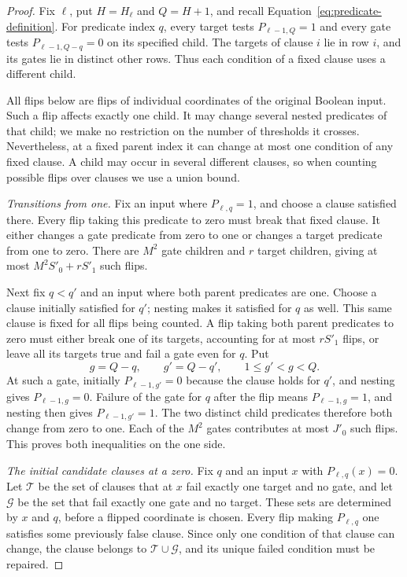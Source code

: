 \documentclass[11pt]{article}
\theoremstyle{definition}
\theoremstyle{remark}
\begin{document}
\begin{proof}
Fix $\ell$, put $H=H_\ell$ and $Q=H+1$, and recall
Equation~\eqref{eq:predicate-definition}.  For predicate index $q$, every
target tests $P_{\ell-1,Q}=1$ and every gate tests
$P_{\ell-1,Q-q}=0$ on its specified child.  The targets of clause $i$
lie in row $i$, and its gates lie in distinct other rows.  Thus each
condition of a fixed clause uses a different child.

All flips below are flips of individual coordinates of the original
Boolean input.  Such a flip affects exactly one child.  It may change
several nested predicates of that child; we make no restriction on the
number of thresholds it crosses.  Nevertheless, at a fixed parent index
it can change at most one condition of any fixed clause.  A child may
occur in several different clauses, so when counting possible flips
over clauses we use a union bound.

\emph{Transitions from one.}
Fix an input where $P_{\ell,q}=1$, and choose a clause satisfied there.
Every flip taking this predicate to zero must break that fixed clause.
It either changes a gate predicate from zero to one or changes a target
predicate from one to zero.  There are $M^2$ gate children and $r$
target children, giving at most $M^2S'_0+rS'_1$ such flips.

Next fix $q<q'$ and an input where both parent predicates are one.
Choose a clause initially satisfied for $q'$; nesting makes it satisfied
for $q$ as well.  This same clause is fixed for all flips being counted.
A flip taking both parent predicates to zero must either break one of
its targets, accounting for at most $rS'_1$ flips, or leave all its
targets true and fail a gate even for $q$.  Put
\[
 g=Q-q,\qquad g'=Q-q',\qquad 1\leq g'<g<Q.
\]
At such a gate, initially $P_{\ell-1,g'}=0$ because the clause holds
for $q'$, and nesting gives $P_{\ell-1,g}=0$.  Failure of the gate for
$q$ after the flip means $P_{\ell-1,g}=1$, and nesting then gives
$P_{\ell-1,g'}=1$.  The two distinct child predicates therefore both
change from zero to one.  Each of the $M^2$ gates contributes at most
$J'_0$ such flips.  This proves both inequalities on the one side.

\emph{The initial candidate clauses at a zero.}
Fix $q$ and an input $x$ with $P_{\ell,q}(x)=0$.  Let $\mathcal T$
be the set of clauses that at $x$ fail exactly one target and no gate,
and let $\mathcal G$ be the set that fail exactly one gate and no
target.  These sets are determined by $x$ and $q$, before a flipped
coordinate is chosen.  Every flip making $P_{\ell,q}$ one satisfies
some previously false clause.  Since only one condition of that clause
can change, the clause belongs to $\mathcal T\cup\mathcal G$, and
its unique failed condition must be repaired.


\end{proof}
\end{document}
